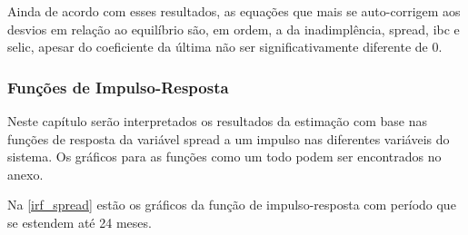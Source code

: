 \documentclass[a4paper,
               article,
               12pt,
               openany,
               oneside,
               english,
               brazil]{abntex2}
\numberwithin{equation}{section}
\begin{document}
    Ainda de acordo com esses resultados, as equações que mais se auto-corrigem aos desvios em relação ao equilíbrio são, em ordem, a da inadimplência, spread, ibc e selic, apesar do coeficiente da última não ser significativamente diferente de 0.

    \subsubsection{Funções de Impulso-Resposta}

    Neste capítulo serão interpretados os resultados da estimação com base nas funções de resposta da variável spread a um impulso nas diferentes variáveis do sistema. Os gráficos para as funções como um todo podem ser encontrados no anexo.

    Na \autoref{irf_spread} estão os gráficos da função de impulso-resposta com período que se estendem até 24 meses.
    
\end{document}
